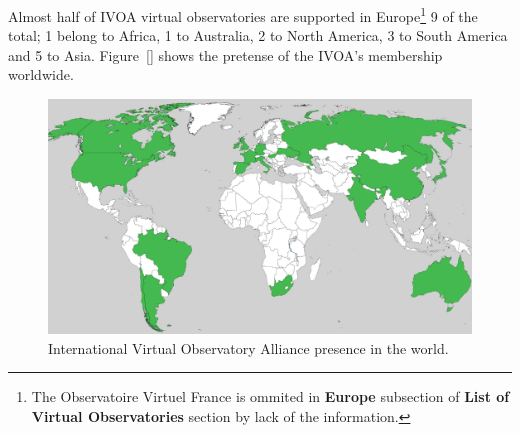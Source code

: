Almost half of IVOA virtual observatories are supported in Europe\footnote{The
Observatoire Virtuel France is ommited in \textbf{Europe} subsection of
\textbf{List of Virtual Observatories} section by lack of the information.} 9 of
the total; 1 belong to Africa, 1 to Australia, 2 to North America, 3 to South
America and 5 to Asia. Figure~\ref{} shows the pretense of the IVOA's membership
worldwide.\\



\begin{figure}%
\begin{center}
	\includegraphics[width=0.9\linewidth]{img/VO-worldwide.png}
	\caption{International Virtual Observatory Alliance presence in the world.}
\end{center}
\end{figure}





